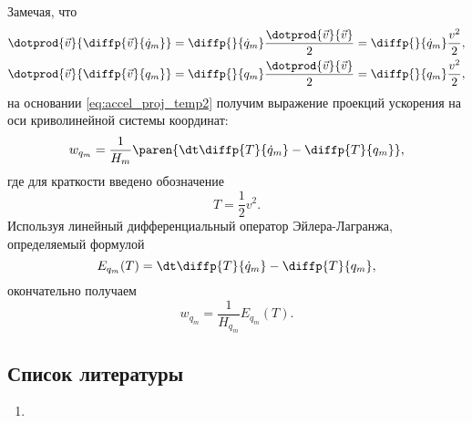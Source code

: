 Замечая, что
\begin{equation*}
  \begin{gathered}
    \dotprod{\vec{v}}{\diffp{\vec{v}}{{\dot{q}_m}}} =
      \diffp{}{{\dot{q}_m}} \frac{\dotprod{\vec{v}}{\vec{v}}}{2} =
      \diffp{}{{\dot{q}_m}} \frac{v^2}{2}, \\
    \dotprod{\vec{v}}{\diffp{\vec{v}}{{q_m}}} =
      \diffp{}{{q_m}} \frac{\dotprod{\vec{v}}{\vec{v}}}{2} =
      \diffp{}{{q_m}} \frac{v^2}{2},
  \end{gathered}
\end{equation*}
на основании \autoref{eq:accel_proj_temp2} получим выражение проекций ускорения
на оси криволинейной системы координат:
\begin{equation}
  w_{q_m} = \frac{1}{H_m} \paren{\dt \diffp{T}{{\dot{q}_m}} - \diffp{T}{{q_m}}},
\end{equation}
где для краткости введено обозначение
\begin{equation}
  T = \frac{1}{2} v^2.
\end{equation}
Используя линейный дифференциальный оператор Эйлера-Лагранжа, определяемый
формулой
\begin{equation}
  E_{q_m}(T) = \dt \diffp{T}{{\dot{q}_m}} - \diffp{T}{{q_m}},
\end{equation}
окончательно получаем
\begin{equation}
  \label{eq:accel_proj}
  w_{q_m} = \frac{1}{H_{q_m}} E_{q_m}(T).
\end{equation}

\subsection{Список литературы}
\begin{enumerate}
  \item \cite{lourie}
\end{enumerate}

